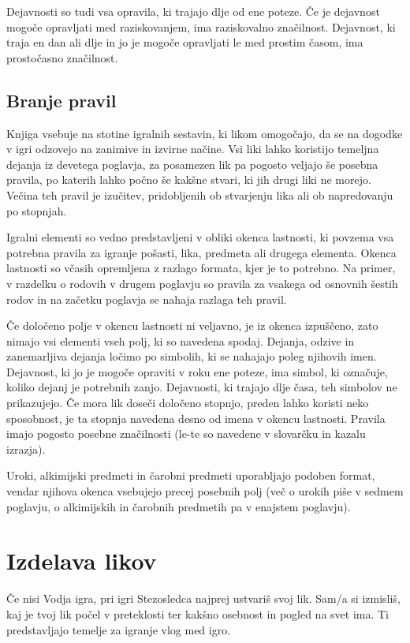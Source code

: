 Dejavnosti so tudi vsa opravila, ki trajajo dlje od ene poteze. Če je dejavnost mogoče opravljati med raziskovanjem, ima raziskovalno značilnost. Dejavnost, ki traja en dan ali dlje in jo je mogoče opravljati le med prostim časom, ima prostočasno značilnost.

\subsection{Branje pravil}
Knjiga vsebuje na stotine igralnih sestavin, ki likom omogočajo, da se na dogodke v igri odzovejo na zanimive in izvirne načine. Vsi liki lahko koristijo temeljna dejanja iz devetega poglavja, za posamezen lik pa pogosto veljajo še posebna pravila, po katerih lahko počno še kakšne stvari, ki jih drugi liki ne morejo. Večina teh pravil je izučitev, pridobljenih ob stvarjenju lika ali ob napredovanju po stopnjah.

Igralni elementi so vedno predstavljeni v obliki okenca lastnosti, ki povzema vsa potrebna pravila za igranje pošasti, lika, predmeta ali drugega elementa. Okenca lastnosti so včasih opremljena z razlago formata, kjer je to potrebno. Na primer, v razdelku o rodovih v drugem poglavju so pravila za vsakega od osnovnih šestih rodov in na začetku poglavja se nahaja razlaga teh pravil.

Če določeno polje v okencu lastnosti ni veljavno, je iz okenca izpuščeno, zato nimajo vsi elementi vseh polj, ki so navedena spodaj. Dejanja, odzive in zanemarljiva dejanja ločimo po simbolih, ki se nahajajo poleg njihovih imen. Dejavnost, ki jo je mogoče opraviti v roku ene poteze, ima simbol, ki označuje, koliko dejanj je potrebnih zanjo. Dejavnosti, ki trajajo dlje časa, teh simbolov ne prikazujejo. Če mora lik doseči določeno stopnjo, preden lahko koristi neko sposobnost, je ta stopnja navedena desno od imena v okencu lastnosti. Pravila imajo pogosto posebne značilnosti (le-te so navedene v slovarčku in kazalu izrazja).

Uroki, alkimijski predmeti in čarobni predmeti uporabljajo podoben format, vendar njihova okenca vsebujejo precej posebnih polj (več o urokih piše v sedmem poglavju, o alkimijskih in čarobnih predmetih pa v enajstem poglavju).

\section{Izdelava likov}
Če nisi Vodja igra, pri igri Stezosledca najprej ustvariš svoj lik. Sam/a si izmisliš, kaj je tvoj lik počel v preteklosti ter kakšno osebnost in pogled na svet ima. Ti predstavljajo temelje za igranje vlog med igro.

